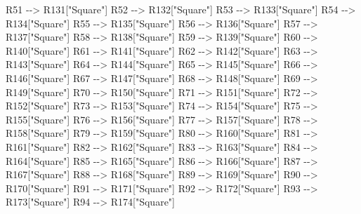 \documentclass[
]{article}
\newenvironment{Shaded}{}{}
\newcommand{\NormalTok}[1]{#1}
\begin{document}
\begin{Shaded}
\begin{Highlighting}[]
\NormalTok{        R51 {-}{-}\textgreater{} R131["Square"]}
\NormalTok{        R52 {-}{-}\textgreater{} R132["Square"]}
\NormalTok{        R53 {-}{-}\textgreater{} R133["Square"]}
\NormalTok{        R54 {-}{-}\textgreater{} R134["Square"]}
\NormalTok{        R55 {-}{-}\textgreater{} R135["Square"]}
\NormalTok{        R56 {-}{-}\textgreater{} R136["Square"]}
\NormalTok{        R57 {-}{-}\textgreater{} R137["Square"]}
\NormalTok{        R58 {-}{-}\textgreater{} R138["Square"]}
\NormalTok{        R59 {-}{-}\textgreater{} R139["Square"]}
\NormalTok{        R60 {-}{-}\textgreater{} R140["Square"]}
\NormalTok{        R61 {-}{-}\textgreater{} R141["Square"]}
\NormalTok{        R62 {-}{-}\textgreater{} R142["Square"]}
\NormalTok{        R63 {-}{-}\textgreater{} R143["Square"]}
\NormalTok{        R64 {-}{-}\textgreater{} R144["Square"]}
\NormalTok{        R65 {-}{-}\textgreater{} R145["Square"]}
\NormalTok{        R66 {-}{-}\textgreater{} R146["Square"]}
\NormalTok{        R67 {-}{-}\textgreater{} R147["Square"]}
\NormalTok{        R68 {-}{-}\textgreater{} R148["Square"]}
\NormalTok{        R69 {-}{-}\textgreater{} R149["Square"]}
\NormalTok{        R70 {-}{-}\textgreater{} R150["Square"]}
\NormalTok{        R71 {-}{-}\textgreater{} R151["Square"]}
\NormalTok{        R72 {-}{-}\textgreater{} R152["Square"]}
\NormalTok{        R73 {-}{-}\textgreater{} R153["Square"]}
\NormalTok{        R74 {-}{-}\textgreater{} R154["Square"]}
\NormalTok{        R75 {-}{-}\textgreater{} R155["Square"]}
\NormalTok{        R76 {-}{-}\textgreater{} R156["Square"]}
\NormalTok{        R77 {-}{-}\textgreater{} R157["Square"]}
\NormalTok{        R78 {-}{-}\textgreater{} R158["Square"]}
\NormalTok{        R79 {-}{-}\textgreater{} R159["Square"]}
\NormalTok{        R80 {-}{-}\textgreater{} R160["Square"]}
\NormalTok{        R81 {-}{-}\textgreater{} R161["Square"]}
\NormalTok{        R82 {-}{-}\textgreater{} R162["Square"]}
\NormalTok{        R83 {-}{-}\textgreater{} R163["Square"]}
\NormalTok{        R84 {-}{-}\textgreater{} R164["Square"]}
\NormalTok{        R85 {-}{-}\textgreater{} R165["Square"]}
\NormalTok{        R86 {-}{-}\textgreater{} R166["Square"]}
\NormalTok{        R87 {-}{-}\textgreater{} R167["Square"]}
\NormalTok{        R88 {-}{-}\textgreater{} R168["Square"]}
\NormalTok{        R89 {-}{-}\textgreater{} R169["Square"]}
\NormalTok{        R90 {-}{-}\textgreater{} R170["Square"]}
\NormalTok{        R91 {-}{-}\textgreater{} R171["Square"]}
\NormalTok{        R92 {-}{-}\textgreater{} R172["Square"]}
\NormalTok{        R93 {-}{-}\textgreater{} R173["Square"]}
\NormalTok{        R94 {-}{-}\textgreater{} R174["Square"]}

\end{Highlighting}
\end{Shaded}
\end{document}
